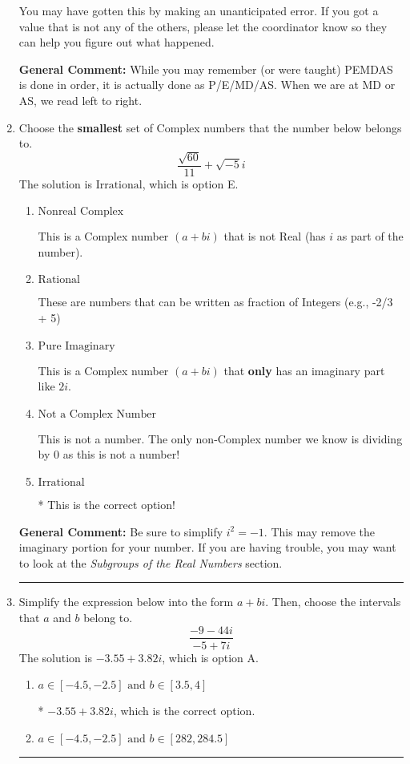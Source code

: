 \documentclass{extbook}[14pt]
\newcommand{\litem}[1]{\item #1

\rule{\textwidth}{0.4pt}}
\begin{document}
\begin{enumerate}
{\begin{enumerate}[label=\Alph*.]
 You may have gotten this by making an unanticipated error. If you got a value that is not any of the others, please let the coordinator know so they can help you figure out what happened.
\end{enumerate}

\textbf{General Comment:} While you may remember (or were taught) PEMDAS is done in order, it is actually done as P/E/MD/AS. When we are at MD or AS, we read left to right.
}
\litem{
Choose the \textbf{smallest} set of Complex numbers that the number below belongs to.
\[ \frac{\sqrt{60}}{11}+\sqrt{-5}i \]The solution is \( \text{Irrational} \), which is option E.\begin{enumerate}[label=\Alph*.]
\item \( \text{Nonreal Complex} \)

This is a Complex number $(a+bi)$ that is not Real (has $i$ as part of the number).
\item \( \text{Rational} \)

These are numbers that can be written as fraction of Integers (e.g., -2/3 + 5)
\item \( \text{Pure Imaginary} \)

This is a Complex number $(a+bi)$ that \textbf{only} has an imaginary part like $2i$.
\item \( \text{Not a Complex Number} \)

This is not a number. The only non-Complex number we know is dividing by 0 as this is not a number!
\item \( \text{Irrational} \)

* This is the correct option!
\end{enumerate}

\textbf{General Comment:} Be sure to simplify $i^2 = -1$. This may remove the imaginary portion for your number. If you are having trouble, you may want to look at the \textit{Subgroups of the Real Numbers} section.
}
\litem{
Simplify the expression below into the form $a+bi$. Then, choose the intervals that $a$ and $b$ belong to.
\[ \frac{-9 - 44 i}{-5 + 7 i} \]The solution is \( -3.55  + 3.82 i \), which is option A.\begin{enumerate}[label=\Alph*.]
\item \( a \in [-4.5, -2.5] \text{ and } b \in [3.5, 4] \)

* $-3.55  + 3.82 i$, which is the correct option.
\item \( a \in [-4.5, -2.5] \text{ and } b \in [282, 284.5] \)


\end{enumerate}}
\end{enumerate}
\end{document}
